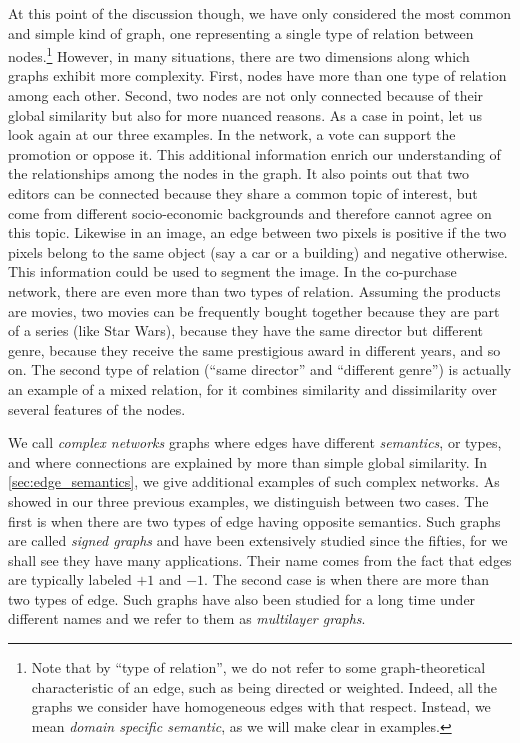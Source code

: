 At this point of the discussion though, we have only considered the most common and simple kind of
graph, one representing a single type of relation between nodes.\footnote{Note that by \enquote{type
of relation}, we do not refer to some graph-theoretical characteristic of an edge, such as being directed or weighted.
Indeed, all the graphs we consider have homogeneous edges with that respect. Instead, we mean \emph{domain
specific semantic}, as we will make clear in examples.} However, in many situations, there
are two dimensions along which graphs exhibit more complexity. First, nodes have more than one type
of relation among each other. Second, two nodes are not only connected because of their global
similarity but also for more nuanced reasons. As a case in point, let us look again at our
three examples. In the \wik{} network, a vote can support the promotion or oppose it. This
additional information enrich our understanding of the relationships among the nodes in the graph.
It also points out that two editors can be connected because they share a common topic of interest,
but come from different socio-economic backgrounds and therefore cannot agree on this topic.
Likewise in an image, an edge between two pixels is positive if the two pixels belong to the same
object (say a car or a building) and negative otherwise. This information could be used to segment
the image. In the co-purchase network, there are even more than two types of relation. Assuming the
products are movies, two movies can be frequently bought together because they are part of a series
(like Star Wars), because they have the same director but different genre, because they receive the
same prestigious award in different years, and so on. The second type of relation (\enquote{same
director} and \enquote{different genre}) is actually an example of a mixed relation, for it combines
similarity and dissimilarity over several features of the nodes.

We call \emph{complex networks} graphs where edges have different \emph{semantics}, or types, and
where connections are explained by more than simple global similarity. In
\autoref{sec:edge_semantics}, we give additional examples of such complex networks. As
showed in our three previous examples, we distinguish between two cases. The first is when there are two types of
edge having opposite semantics. Such graphs are called \emph{signed graphs} and have been
extensively studied since the fifties, for we shall see they have many applications. Their name
comes from the fact that edges are typically labeled $+1$ and $-1$. The second case
is when there are more than two types of edge. Such graphs have also been studied for a long time
under different names and we refer to them as \emph{multilayer graphs}.


